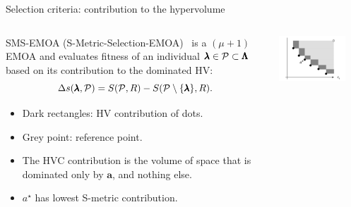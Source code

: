 \begin{frame}[allowframebreaks]{Selection criteria: contribution to the hypervolume}

\begin{columns}
\begin{column}{0.5\textwidth}
SMS-EMOA (S-Metric-Selection-EMOA)~ is a $(\mu+1)$ EMOA and evaluates fitness of an individual $\pmb{\lambda} \in \mathcal{P} \subset \pmb{\Lambda}$ based on its contribution to the dominated HV:
$$
\Delta s(\pmb{\lambda}, \mathcal{P}) = S(\mathcal{P}, R) - S(\mathcal{P} \setminus \{ \pmb{\lambda}\}, R).
$$

\begin{itemize}
\item Dark rectangles: HV contribution of dots.
\item Grey point: reference point.
\item The HVC contribution is the volume of space that is dominated only by $\bm{a}$, and nothing else.
\item $a^\star$ has lowest S-metric contribution.
\end{itemize}
\end{column}

\begin{column}{0.5\textwidth}
\begin{center}
\includegraphics[width = 0.8\textwidth]{images/hypervolumenbeitrag.png}
\end{center}
\end{column}
\end{columns}


\end{frame}
